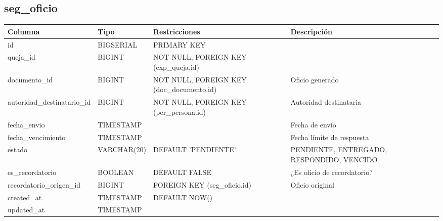 \documentclass[12pt, a4paper]{article}
\begin{document}
\subsection{seg\_oficio}
\begin{longtable}{|p{3.5cm}|p{2.5cm}|p{3cm}|p{5cm}|}
    \hline
    \rowcolor[gray]{0.9}
    \textbf{Columna} & \textbf{Tipo} & \textbf{Restricciones} & \textbf{Descripción} \\
    \hline
    id & BIGSERIAL & PRIMARY KEY & \\
    \hline
    queja\_id & BIGINT & NOT NULL, FOREIGN KEY (exp\_queja.id) & \\
    \hline
    documento\_id & BIGINT & NOT NULL, FOREIGN KEY (doc\_documento.id) & Oficio generado \\
    \hline
    autoridad\_destinatario\_id & BIGINT & NOT NULL, FOREIGN KEY (per\_persona.id) & Autoridad destinataria \\
    \hline
    fecha\_envio & TIMESTAMP & & Fecha de envío \\
    \hline
    fecha\_vencimiento & TIMESTAMP & & Fecha límite de respuesta \\
    \hline
    estado & VARCHAR(20) & DEFAULT 'PENDIENTE' & PENDIENTE, ENTREGADO, RESPONDIDO, VENCIDO \\
    \hline
    es\_recordatorio & BOOLEAN & DEFAULT FALSE & ¿Es oficio de recordatorio? \\
    \hline
    recordatorio\_origen\_id & BIGINT & FOREIGN KEY (seg\_oficio.id) & Oficio original \\
    \hline
    created\_at & TIMESTAMP & DEFAULT NOW() & \\
    \hline
    updated\_at & TIMESTAMP & & \\
    \hline
\end{longtable}
\end{document}
